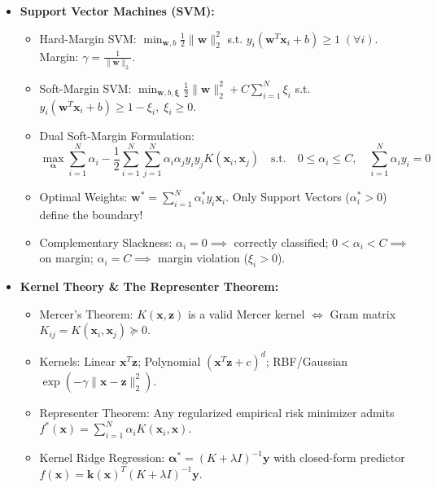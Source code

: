 \begin{tcolorbox}[breakable, colback=primarylight!30, colframe=primarydark, title={\large \textbf{5. Constrained Optimization, KKT \& Support Vector Machines (Weeks 9--10)}}]
\begin{itemize}[leftmargin=*, noitemsep, topsep=2pt]
\begin{align*}
    \end{align*}
    \item \textbf{Support Vector Machines (SVM):}
    \begin{itemize}[leftmargin=*, noitemsep]
        \item Hard-Margin SVM: $\min_{\mathbf{w}, b} \frac{1}{2}\|\mathbf{w}\|_2^2$ s.t. $y_i(\mathbf{w}^T \mathbf{x}_i + b) \ge 1 \; (\forall i)$. Margin: $\gamma = \frac{1}{\|\mathbf{w}\|_2}$.
        \item Soft-Margin SVM: $\min_{\mathbf{w}, b, \boldsymbol{\xi}} \frac{1}{2}\|\mathbf{w}\|_2^2 + C \sum_{i=1}^N \xi_i$ s.t. $y_i(\mathbf{w}^T \mathbf{x}_i + b) \ge 1 - \xi_i, \; \xi_i \ge 0$.
        \item Dual Soft-Margin Formulation:
        \begin{equation*}
        \max_{\boldsymbol{\alpha}} \sum_{i=1}^N \alpha_i - \frac{1}{2}\sum_{i=1}^N \sum_{j=1}^N \alpha_i \alpha_j y_i y_j K(\mathbf{x}_i, \mathbf{x}_j) \quad \text{s.t.} \quad 0 \le \alpha_i \le C, \quad \sum_{i=1}^N \alpha_i y_i = 0
        \end{equation*}
        \item Optimal Weights: $\mathbf{w}^* = \sum_{i=1}^N \alpha_i^* y_i \mathbf{x}_i$. Only Support Vectors ($\alpha_i^* > 0$) define the boundary!
        \item Complementary Slackness: $\alpha_i = 0 \implies$ correctly classified; $0 < \alpha_i < C \implies$ on margin; $\alpha_i = C \implies$ margin violation ($\xi_i > 0$).
    \end{itemize}
    \item \textbf{Kernel Theory \& The Representer Theorem:}
    \begin{itemize}[leftmargin=*, noitemsep]
        \item Mercer's Theorem: $K(\mathbf{x}, \mathbf{z})$ is a valid Mercer kernel $\iff$ Gram matrix $K_{ij} = K(\mathbf{x}_i, \mathbf{x}_j) \succeq 0$.
        \item Kernels: Linear $\mathbf{x}^T \mathbf{z}$; Polynomial $(\mathbf{x}^T \mathbf{z} + c)^d$; RBF/Gaussian $\exp(-\gamma \|\mathbf{x} - \mathbf{z}\|_2^2)$.
        \item Representer Theorem: Any regularized empirical risk minimizer admits $f^*(\mathbf{x}) = \sum_{i=1}^N \alpha_i K(\mathbf{x}_i, \mathbf{x})$.
        \item Kernel Ridge Regression: $\boldsymbol{\alpha}^* = (K + \lambda I)^{-1}\mathbf{y}$ with closed-form predictor $f(\mathbf{x}) = \mathbf{k}(\mathbf{x})^T (K + \lambda I)^{-1}\mathbf{y}$.
    \end{itemize}
\end{itemize}
\end{tcolorbox}

